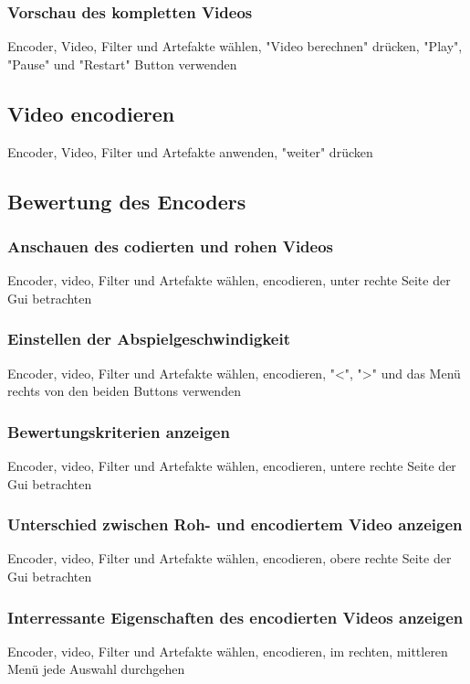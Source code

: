 \documentclass[parskip=full]{scrartcl}
\begin{document}
\subsubsection{Vorschau des kompletten Videos}
Encoder, Video, Filter und Artefakte wählen, "Video berechnen" drücken, "Play", "Pause" und "Restart" Button verwenden
\subsection{Video encodieren}
Encoder, Video, Filter und Artefakte anwenden, "weiter" drücken
\subsection{Bewertung des Encoders}
\subsubsection{Anschauen des codierten und rohen Videos}
Encoder, video, Filter und Artefakte wählen, encodieren, unter rechte Seite der Gui betrachten
\subsubsection{Einstellen der Abspielgeschwindigkeit}
Encoder, video, Filter und Artefakte wählen, encodieren, "<", ">" und das Menü rechts von den beiden Buttons verwenden
\subsubsection{Bewertungskriterien anzeigen}
Encoder, video, Filter und Artefakte wählen, encodieren, untere rechte Seite der Gui betrachten
\subsubsection{Unterschied zwischen Roh- und encodiertem Video anzeigen}
Encoder, video, Filter und Artefakte wählen, encodieren, obere rechte Seite der Gui betrachten
\subsubsection{Interressante Eigenschaften des encodierten Videos anzeigen}
Encoder, video, Filter und Artefakte wählen, encodieren, im rechten, mittleren Menü jede Auswahl durchgehen
\end{document}
